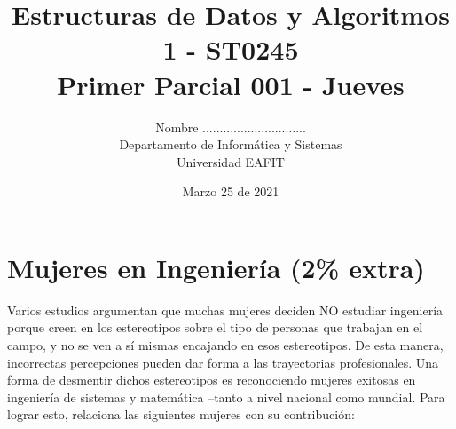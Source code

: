 \documentclass[10 pt]{article}
\title{\textbf {Estructuras de Datos y Algoritmos 1 - ST0245\\Primer Parcial 001 - Jueves}}
\author{Nombre ..............................\\
		Departamento de Informática y Sistemas\\
		Universidad EAFIT\\}
\date{Marzo 25 de 2021}
\begin{document}
\lstset{language=Java,frame=none, breaklines=true, numbers = left, stepnumber = 1, xleftmargin=5.0ex, showstringspaces=false, showspaces=false }
\lstset{language=Python,frame=none, breaklines=true, numbers = left, stepnumber = 1, xleftmargin=5.0ex, showstringspaces=false,showspaces=false }
\maketitle

\section{Mujeres en Ingeniería (2\% extra)}
 Varios estudios argumentan que muchas mujeres deciden NO estudiar ingeniería porque creen en los estereotipos sobre el tipo de personas que trabajan en el campo, y no se ven a sí mismas encajando en esos estereotipos. De esta manera, incorrectas percepciones pueden dar forma a las trayectorias profesionales. Una forma de desmentir dichos estereotipos es reconociendo mujeres exitosas en ingeniería de sistemas y matemática --tanto a nivel nacional como mundial. Para lograr esto, relaciona las siguientes mujeres con su contribución:


 \hspace{1cm}


\end{document}
